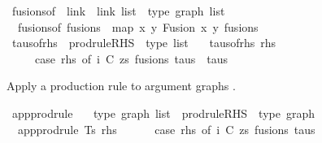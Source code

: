 \begin{isabellebody}
\isamarkupfalse%
\ fusions{\isacharunderscore}{\kern0pt}of\ {\isacharcolon}{\kern0pt}{\isacharcolon}{\kern0pt}\ {\isachardoublequoteopen}{\isacharparenleft}{\kern0pt}link\ {\isacharasterisk}{\kern0pt}\ link{\isacharparenright}{\kern0pt}\ list\ {\isacharequal}{\kern0pt}{\isachargreater}{\kern0pt}\ type\ graph\ list{\isachardoublequoteclose}\ \isanewline
\ \ {\isachardoublequoteopen}fusions{\isacharunderscore}{\kern0pt}of\ fusions\ {\isacharequal}{\kern0pt}\ map\ {\isacharparenleft}{\kern0pt}{\isasymlambda}{\isacharparenleft}{\kern0pt}x{\isacharcomma}{\kern0pt}\ y{\isacharparenright}{\kern0pt}{\isachardot}{\kern0pt}\ Fusion\ x\ y{\isacharparenright}{\kern0pt}\ fusions{\isachardoublequoteclose}\isanewline
\isanewline
\isanewline
{}\isamarkupfalse%
\ taus{\isacharunderscore}{\kern0pt}of{\isacharunderscore}{\kern0pt}rhs\ {\isacharcolon}{\kern0pt}{\isacharcolon}{\kern0pt}\ {\isachardoublequoteopen}prodrule{\isacharunderscore}{\kern0pt}RHS\ {\isacharequal}{\kern0pt}{\isachargreater}{\kern0pt}\ type\ list{\isachardoublequoteclose}\ \isanewline
\ \ {\isachardoublequoteopen}taus{\isacharunderscore}{\kern0pt}of{\isacharunderscore}{\kern0pt}rhs\ rhs\ {\isacharequal}{\kern0pt}\isanewline
\ \ \ \ \ {\isacharparenleft}{\kern0pt}case\ rhs\ of\ {\isacharparenleft}{\kern0pt}i{\isacharcomma}{\kern0pt}\ {\isacharparenleft}{\kern0pt}C{\isacharcomma}{\kern0pt}\ zs{\isacharparenright}{\kern0pt}{\isacharcomma}{\kern0pt}\ fusions{\isacharcomma}{\kern0pt}\ taus{\isacharparenright}{\kern0pt}\ {\isacharequal}{\kern0pt}{\isachargreater}{\kern0pt}\ taus{\isacharparenright}{\kern0pt}{\isachardoublequoteclose}%
\begin{isamarkuptext}%
Apply a production rule to argument graphs .%
\end{isamarkuptext}\isamarkuptrue%
\isamarkupfalse%
\ app{\isacharunderscore}{\kern0pt}prodrule\ {\isacharcolon}{\kern0pt}{\isacharcolon}{\kern0pt}\isanewline
\ \ {\isachardoublequoteopen}type\ graph\ list\ {\isacharequal}{\kern0pt}{\isachargreater}{\kern0pt}\ prodrule{\isacharunderscore}{\kern0pt}RHS\ {\isacharequal}{\kern0pt}{\isachargreater}{\kern0pt}\ type\ graph{\isachardoublequoteclose}\ \isanewline
\ \ {\isachardoublequoteopen}app{\isacharunderscore}{\kern0pt}prodrule\ Ts\ rhs\ {\isacharequal}{\kern0pt}\isanewline
\ \ \ \ \ {\isacharparenleft}{\kern0pt}case\ rhs\ of\ {\isacharparenleft}{\kern0pt}i{\isacharcomma}{\kern0pt}\ {\isacharparenleft}{\kern0pt}C{\isacharcomma}{\kern0pt}\ zs{\isacharparenright}{\kern0pt}{\isacharcomma}{\kern0pt}\ fusions{\isacharcomma}{\kern0pt}\ taus{\isacharparenright}{\kern0pt}\ {\isacharequal}{\kern0pt}{\isachargreater}{\kern0pt}\isanewline

\end{isabellebody}
